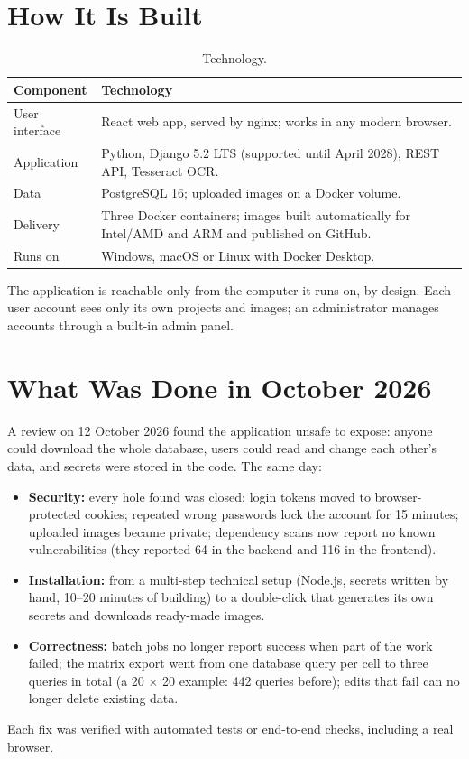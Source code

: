 \documentclass[10pt,a4paper]{scrartcl}
\newcommand{\RuleSection}[1]{%
    \section{#1}%
    \vspace{0.2em}{\color{accent!35}\hrule height 0.4pt}\vspace{0.3em}%
  }
\begin{document}
  \RuleSection{How It Is Built}
  \label{sec:built}

  \begin{table}[h]
  \small
  \centering
  \renewcommand{\arraystretch}{1.1}
  \begin{tabularx}{\textwidth}{@{}L{3.4cm} X@{}}
  \toprule
  \textbf{Component} & \textbf{Technology} \\[.3cm]
  \midrule
  User interface & React web app, served by nginx; works in any modern browser. \\[.3cm]
  Application & Python, Django 5.2 LTS (supported until April 2028), REST API, Tesseract OCR. \\[.3cm]
  Data & PostgreSQL 16; uploaded images on a Docker volume. \\[.3cm]
  Delivery & Three Docker containers; images built automatically for Intel/AMD and ARM and published on GitHub. \\[.3cm]
  Runs on & Windows, macOS or Linux with Docker Desktop. \\[.3cm]
  \bottomrule
  \end{tabularx}
  \caption{Technology.}
  \label{tab:tech}
  \end{table}

  The application is reachable only from the computer it runs on, by design. Each user account sees only its own
  projects and images; an administrator manages accounts through a built-in admin panel.

  \RuleSection{What Was Done in October 2026}
  \label{sec:done}

  A review on 12 October 2026 found the application unsafe to expose: anyone could download the whole database,
  users could read and change each other's data, and secrets were stored in the code. The same day:
  \begin{itemize}
    \item \textbf{Security:} every hole found was closed; login tokens moved to browser-protected cookies; repeated
          wrong passwords lock the account for 15 minutes; uploaded images became private; dependency scans now report
          no known vulnerabilities (they reported 64 in the backend and 116 in the frontend).
    \item \textbf{Installation:} from a multi-step technical setup (Node.js, secrets written by hand, 10--20 minutes of building) to
          a double-click that generates its own secrets and downloads ready-made images.
    \item \textbf{Correctness:} batch jobs no longer report success when part of the work failed; the matrix export
          went from one database query per cell to three queries in total (a 20 $\times$ 20 example: 442 queries
          before); edits that fail can no longer delete existing data.
  \end{itemize}
  Each fix was verified with automated tests or end-to-end checks, including a real browser.
\end{document}
